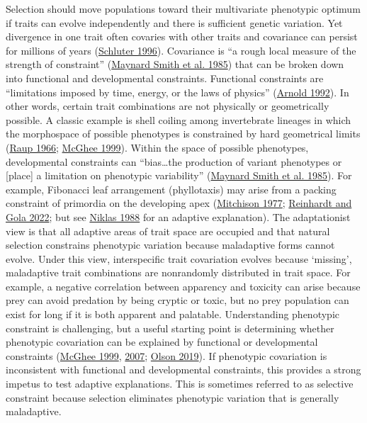 \documentclass[
  12pt,
]{article}
\begin{document}
Selection should move populations toward their multivariate phenotypic optimum if traits can evolve independently and there is sufficient genetic variation. Yet divergence in one trait often covaries with other traits and covariance can persist for millions of years (\protect\hyperlink{ref-schluter_adaptive_1996}{Schluter 1996}). Covariance is ``a rough local measure of the strength of constraint'' (\protect\hyperlink{ref-maynard_smith_developmental_1985}{Maynard Smith et al. 1985}) that can be broken down into functional and developmental constraints. Functional constraints are ``limitations imposed by time, energy, or the laws of physics'' (\protect\hyperlink{ref-arnold_constraints_1992}{Arnold 1992}). In other words, certain trait combinations are not physically or geometrically possible. A classic example is shell coiling among invertebrate lineages in which the morphospace of possible phenotypes is constrained by hard geometrical limits (\protect\hyperlink{ref-raup_geometric_1966}{Raup 1966}; \protect\hyperlink{ref-mcghee_theoretical_1999}{McGhee 1999}). Within the space of possible phenotypes, developmental constraints can ``bias\ldots the production of variant phenotypes or {[}place{]} a limitation on phenotypic variability'' (\protect\hyperlink{ref-maynard_smith_developmental_1985}{Maynard Smith et al. 1985}). For example, Fibonacci leaf arrangement (phyllotaxis) may arise from a packing constraint of primordia on the developing apex (\protect\hyperlink{ref-mitchison_phyllotaxis_1977}{Mitchison 1977}; \protect\hyperlink{ref-reinhardt_law_2022}{Reinhardt and Gola 2022}; but see \protect\hyperlink{ref-niklas_role_1988}{Niklas 1988} for an adaptive explanation). The adaptationist view is that all adaptive areas of trait space are occupied and that natural selection constrains phenotypic variation because maladaptive forms cannot evolve. Under this view, interspecific trait covariation evolves because `missing', maladaptive trait combinations are nonrandomly distributed in trait space. For example, a negative correlation between apparency and toxicity can arise because prey can avoid predation by being cryptic or toxic, but no prey population can exist for long if it is both apparent and palatable. Understanding phenotypic constraint is challenging, but a useful starting point is determining whether phenotypic covariation can be explained by functional or developmental constraints (\protect\hyperlink{ref-mcghee_theoretical_1999}{McGhee 1999}, \protect\hyperlink{ref-mcghee_geometry_2007}{2007}; \protect\hyperlink{ref-olson_plant_2019}{Olson 2019}). If phenotypic covariation is inconsistent with functional and developmental constraints, this provides a strong impetus to test adaptive explanations. This is sometimes referred to as selective constraint because selection eliminates phenotypic variation that is generally maladaptive.
\end{document}
